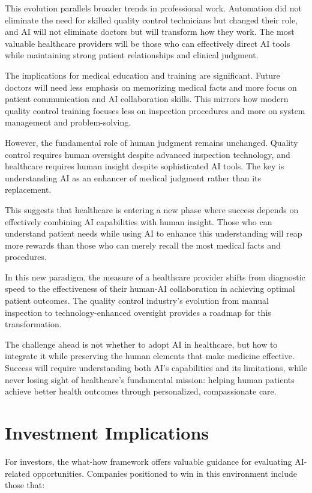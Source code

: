 \documentclass[
  Letterpaper,
]{scrbook}
\begin{document}
This evolution parallels broader trends in professional work. Automation
did not eliminate the need for skilled quality control technicians but
changed their role, and AI will not eliminate doctors but will transform
how they work. The most valuable healthcare providers will be those who
can effectively direct AI tools while maintaining strong patient
relationships and clinical judgment.

The implications for medical education and training are significant.
Future doctors will need less emphasis on memorizing medical facts and
more focus on patient communication and AI collaboration skills. This
mirrors how modern quality control training focuses less on inspection
procedures and more on system management and problem-solving.

However, the fundamental role of human judgment remains unchanged.
Quality control requires human oversight despite advanced inspection
technology, and healthcare requires human insight despite sophisticated
AI tools. The key is understanding AI as an enhancer of medical judgment
rather than its replacement.

This suggests that healthcare is entering a new phase where success
depends on effectively combining AI capabilities with human insight.
Those who can understand patient needs while using AI to enhance this
understanding will reap more rewards than those who can merely recall
the most medical facts and procedures.

In this new paradigm, the measure of a healthcare provider shifts from
diagnostic speed to the effectiveness of their human-AI collaboration in
achieving optimal patient outcomes. The quality control industry's
evolution from manual inspection to technology-enhanced oversight
provides a roadmap for this transformation.

The challenge ahead is not whether to adopt AI in healthcare, but how to
integrate it while preserving the human elements that make medicine
effective. Success will require understanding both AI's capabilities and
its limitations, while never losing sight of healthcare's fundamental
mission: helping human patients achieve better health outcomes through
personalized, compassionate care.

\section{Investment Implications}\label{investment-implications}

For investors, the what-how framework offers valuable guidance for
evaluating AI-related opportunities. Companies positioned to win in this
environment include those that:
\end{document}
